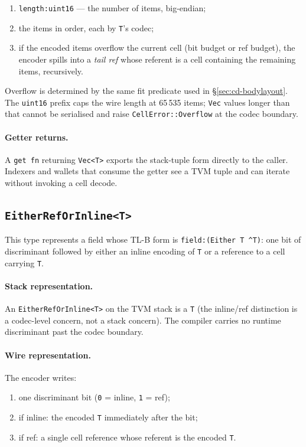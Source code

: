 \documentclass[12pt,oneside]{article}
\begin{document}
\begin{enumerate}
\item \verb|length:uint16| --- the number of items, big-endian;
\item the items in order, each by \verb|T|'s codec;
\item if the encoded items overflow the current cell (bit budget or ref
budget), the encoder spills into a \emph{tail ref} whose referent is a
cell containing the remaining items, recursively.
\end{enumerate}

Overflow is determined by the same fit predicate used in
\S\ref{sec:cd-bodylayout}. The \verb|uint16| prefix caps the wire length at
65\,535 items; \verb|Vec| values longer than that cannot be serialised and
raise \verb|CellError::Overflow| at the codec boundary.

\paragraph{Getter returns.}
A \verb|get fn| returning \verb|Vec<T>| exports the stack-tuple form
directly to the caller. Indexers and wallets that consume the getter see a
TVM tuple and can iterate without invoking a cell decode.

\subsection{\texttt{EitherRefOrInline<T>}}
\label{sec:either-ref-inline}
This type represents a field whose TL-B form is \verb|field:(Either T ^T)|:
one bit of discriminant followed by either an inline encoding of \verb|T| or
a reference to a cell carrying \verb|T|.

\paragraph{Stack representation.}
An \verb|EitherRefOrInline<T>| on the TVM stack is a \verb|T| (the
inline/ref distinction is a codec-level concern, not a stack concern). The
compiler carries no runtime discriminant past the codec boundary.

\paragraph{Wire representation.}
The encoder writes:

\begin{enumerate}
\item one discriminant bit (\verb|0| = inline, \verb|1| = ref);
\item if inline: the encoded \verb|T| immediately after the bit;
\item if ref: a single cell reference whose referent is the encoded \verb|T|.
\end{enumerate}
\end{document}
